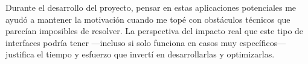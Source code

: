 Durante el desarrollo del proyecto, pensar en estas aplicaciones potenciales me ayudó a mantener la motivación cuando me topé con obstáculos técnicos que parecían imposibles de resolver. La perspectiva del impacto real que este tipo de interfaces podría tener —incluso si solo funciona en casos muy específicos— justifica el tiempo y esfuerzo que invertí en desarrollarlas y optimizarlas.
